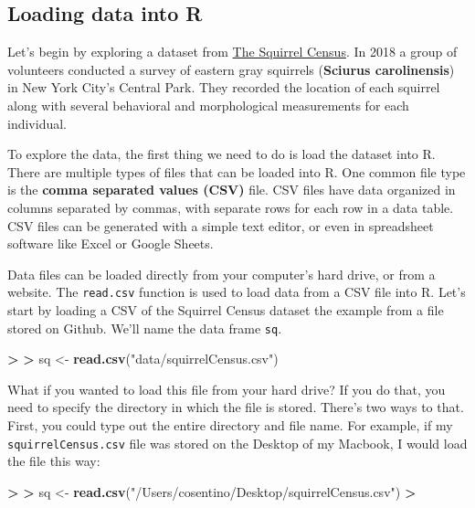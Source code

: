 \documentclass[
]{book}
\newenvironment{Shaded}{\begin{snugshade}}{\end{snugshade}}
\newcommand{\ErrorTok}[1]{\textcolor[rgb]{0.64,0.00,0.00}{\textbf{#1}}}
\newcommand{\FunctionTok}[1]{\textcolor[rgb]{0.13,0.29,0.53}{\textbf{#1}}}
\newcommand{\NormalTok}[1]{#1}
\newcommand{\OtherTok}[1]{\textcolor[rgb]{0.56,0.35,0.01}{#1}}
\newcommand{\SpecialCharTok}[1]{\textcolor[rgb]{0.81,0.36,0.00}{\textbf{#1}}}
\newcommand{\StringTok}[1]{\textcolor[rgb]{0.31,0.60,0.02}{#1}}
\begin{document}
\subsection{Loading data into R}\label{loading-data-into-r}

Let's begin by exploring a dataset from \href{https://www.thesquirrelcensus.com/}{The Squirrel Census}. In 2018 a group of volunteers conducted a survey of eastern gray squirrels (\textbf{Sciurus carolinensis}) in New York City's Central Park. They recorded the location of each squirrel along with several behavioral and morphological measurements for each individual.

To explore the data, the first thing we need to do is load the dataset into R. There are multiple types of files that can be loaded into R. One common file type is the \textbf{comma separated values (CSV)} file. CSV files have data organized in columns separated by commas, with separate rows for each row in a data table. CSV files can be generated with a simple text editor, or even in spreadsheet software like Excel or Google Sheets.

Data files can be loaded directly from your computer's hard drive, or from a website. The \texttt{read.csv} function is used to load data from a CSV file into R. Let's start by loading a CSV of the Squirrel Census dataset the example from a file stored on Github. We'll name the data frame \texttt{sq}.

\begin{Shaded}
\begin{Highlighting}[]
\SpecialCharTok{\textgreater{}} 
\ErrorTok{\textgreater{}}\NormalTok{ sq }\OtherTok{\textless{}{-}} \FunctionTok{read.csv}\NormalTok{(}\StringTok{"data/squirrelCensus.csv"}\NormalTok{)}
\end{Highlighting}
\end{Shaded}

What if you wanted to load this file from your hard drive? If you do that, you need to specify the directory in which the file is stored. There's two ways to that. First, you could type out the entire directory and file name. For example, if my \texttt{squirrelCensus.csv} file was stored on the Desktop of my Macbook, I would load the file this way:

\begin{Shaded}
\begin{Highlighting}[]
\SpecialCharTok{\textgreater{}} 
\ErrorTok{\textgreater{}}\NormalTok{ sq }\OtherTok{\textless{}{-}} \FunctionTok{read.csv}\NormalTok{(}\StringTok{"/Users/cosentino/Desktop/squirrelCensus.csv"}\NormalTok{)}
\SpecialCharTok{\textgreater{}} 
\end{Highlighting}
\end{Shaded}
\end{document}

